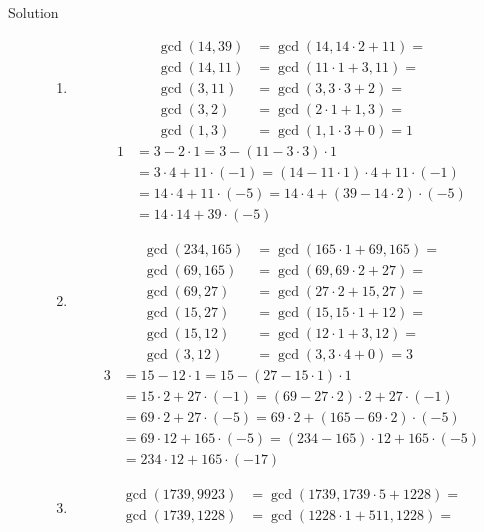 \begin{description}
\item[Solution]
\begin{enumerate}
\item
\begin{align*}
\gcd(14, 39) &= \gcd(14, 14 \cdot 2 + 11) = \\
\gcd(14, 11) &= \gcd(11 \cdot 1 + 3, 11) = \\
\gcd(3, 11)  &= \gcd(3, 3 \cdot 3 + 2) = \\
\gcd(3, 2)   &= \gcd(2 \cdot 1 + 1, 3) = \\
\gcd(1, 3)   &= \gcd(1, 1 \cdot 3 + 0) = 1
\end{align*}
\begin{align*}
1 &= 3 - 2 \cdot 1 = 3 - (11 - 3 \cdot 3) \cdot 1 \\
  &= 3 \cdot 4 + 11 \cdot (-1) = (14 - 11 \cdot 1) \cdot 4 + 11 \cdot (-1) \\
  &= 14 \cdot 4 + 11 \cdot (-5) = 14 \cdot 4 + (39 - 14 \cdot 2) \cdot (-5) \\
  &= 14 \cdot 14 + 39 \cdot (-5)
\end{align*}
\item
\begin{align*}
\gcd(234, 165) &= \gcd(165 \cdot 1 + 69, 165) = \\
\gcd(69, 165)  &= \gcd(69, 69 \cdot 2 + 27) = \\
\gcd(69, 27)   &= \gcd(27 \cdot 2 + 15, 27) = \\
\gcd(15, 27)   &= \gcd(15, 15 \cdot 1 + 12) = \\
\gcd(15, 12)   &= \gcd(12 \cdot 1 + 3, 12) = \\
\gcd(3, 12)    &= \gcd(3, 3 \cdot 4 + 0) = 3
\end{align*}
\begin{align*}
3 &= 15 - 12 \cdot 1 = 15 - (27 - 15 \cdot 1) \cdot 1 \\
  &= 15 \cdot 2 + 27 \cdot (-1) = (69 - 27 \cdot 2) \cdot 2 + 27 \cdot (-1) \\
  &= 69 \cdot 2 + 27 \cdot (-5) = 69 \cdot 2 + (165 - 69 \cdot 2) \cdot (-5) \\
  &= 69 \cdot 12 + 165 \cdot (-5) = (234 - 165) \cdot 12 + 165 \cdot (-5) \\
  &= 234 \cdot 12 + 165 \cdot (-17)
\end{align*}
\item
\begin{align*}
\gcd(1739, 9923) &= \gcd(1739, 1739 \cdot 5 + 1228) = \\
\gcd(1739, 1228) &= \gcd(1228 \cdot 1 + 511, 1228) = \\

\end{align*}
\end{enumerate}
\end{description}
